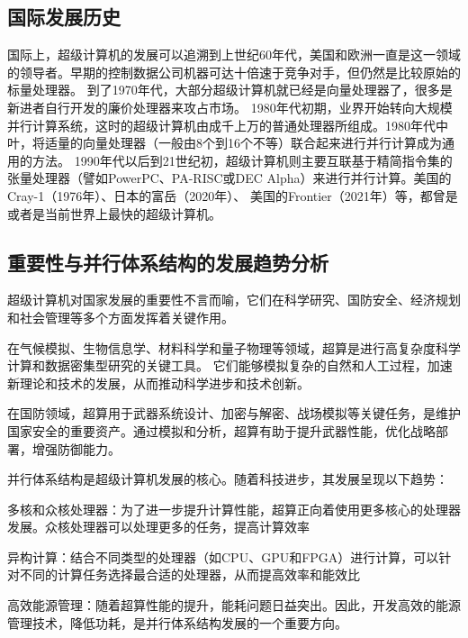 \documentclass{ctexart}
\begin{document}
\subsection{国际发展历史}
国际上，超级计算机的发展可以追溯到上世纪60年代，美国和欧洲一直是这一领域的领导者。早期的控制数据公司机器可达十倍速于竞争对手，但仍然是比较原始的标量处理器。
到了1970年代，大部分超级计算机就已经是向量处理器了，很多是新进者自行开发的廉价处理器来攻占市场。
1980年代初期，业界开始转向大规模并行计算系统，这时的超级计算机由成千上万的普通处理器所组成。1980年代中叶，将适量的向量处理器（一般由8个到16个不等）联合起来进行并行计算成为通用的方法。
1990年代以后到21世纪初，超级计算机则主要互联基于精简指令集的张量处理器（譬如PowerPC、PA-RISC或DEC Alpha）来进行并行计算。美国的Cray-1（1976年）、日本的富岳（2020年）、
美国的Frontier（2021年）等，都曾是或者是当前世界上最快的超级计算机。
\subsection{重要性与并行体系结构的发展趋势分析}
超级计算机对国家发展的重要性不言而喻，它们在科学研究、国防安全、经济规划和社会管理等多个方面发挥着关键作用。

在气候模拟、生物信息学、材料科学和量子物理等领域，超算是进行高复杂度科学计算和数据密集型研究的关键工具。
它们能够模拟复杂的自然和人工过程，加速新理论和技术的发展，从而推动科学进步和技术创新。

在国防领域，超算用于武器系统设计、加密与解密、战场模拟等关键任务，是维护国家安全的重要资产。通过模拟和分析，超算有助于提升武器性能，优化战略部署，增强防御能力。

并行体系结构是超级计算机发展的核心。随着科技进步，其发展呈现以下趋势：

多核和众核处理器：为了进一步提升计算性能，超算正向着使用更多核心的处理器发展。众核处理器可以处理更多的任务，提高计算效率

异构计算：结合不同类型的处理器（如CPU、GPU和FPGA）进行计算，可以针对不同的计算任务选择最合适的处理器，从而提高效率和能效比

高效能源管理：随着超算性能的提升，能耗问题日益突出。因此，开发高效的能源管理技术，降低功耗，是并行体系结构发展的一个重要方向。
\end{document}
